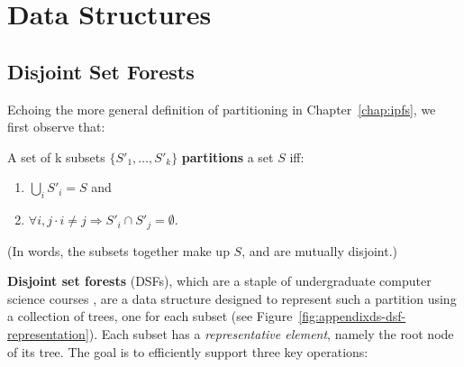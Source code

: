 \chapter{Data Structures}
\label{chap:appendixds}

\section{Disjoint Set Forests}
\label{sec:appendixds-dsf}


Echoing the more general definition of partitioning in Chapter~\ref{chap:ipfs}, we first observe that:

\begin{definition}
A set of k subsets $\{S'_1,\ldots,S'_k\}$ \textbf{partitions} a set $S$ iff:

\begin{enumerate}
\item $\bigcup_i S'_i = S$ and
\item $\forall i,j \cdot i \ne j \Rightarrow S'_i \cap S'_j = \emptyset$.
\end{enumerate}

\noindent (In words, the subsets together make up $S$, and are mutually disjoint.)
\end{definition}

\noindent \textbf{Disjoint set forests} (DSFs), which are a staple of undergraduate computer science courses \cite{worrell06}, are a data structure designed to represent such a partition using a collection of trees, one for each subset (see Figure~\ref{fig:appendixds-dsf-representation}). Each subset has a \emph{representative element}, namely the root node of its tree. The goal is to efficiently support three key operations:


